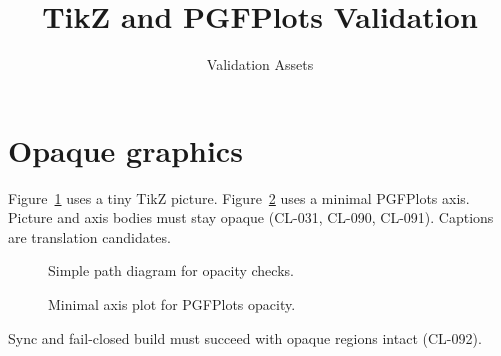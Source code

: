 \documentclass[11pt]{article}
\title{TikZ and PGFPlots Validation}
\author{Validation Assets}
\date{}
\begin{document}
\maketitle

\section{Opaque graphics}
\label{sec:graphics}

Figure~\ref{fig:line} uses a tiny TikZ picture. Figure~\ref{fig:axis} uses a
minimal PGFPlots axis. Picture and axis bodies must stay opaque (CL-031,
CL-090, CL-091). Captions are translation candidates.

\begin{figure}[ht]
  \centering
  \caption{Simple path diagram for opacity checks.}
  \label{fig:line}
\end{figure}

\begin{figure}[ht]
  \centering
  \caption{Minimal axis plot for PGFPlots opacity.}
  \label{fig:axis}
\end{figure}

Sync and fail-closed build must succeed with opaque regions intact (CL-092).
\end{document}
